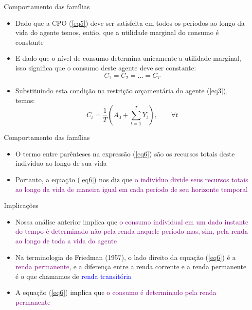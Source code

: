\documentclass[10pt]{beamer}
\begin{document}
\begin{frame}{Comportamento das famílias}
    \begin{itemize}
        \item Dado que a CPO (\ref{eq5}) deve ser satisfeita em todos os períodos ao longo da vida do agente temos, então, que a utilidade marginal do consumo é constante
        \bigskip
        \item E dado que o nível de consumo determina unicamente a utilidade marginal, isso significa que o consumo deste agente deve ser constante:
        \[
        C_1 = C_2 = \dots = C_T
        \]
        \bigskip
        \item Substituindo esta condição na restrição orçamentária do agente (\ref{eq3}), temos:
        \begin{equation}
            C_t = \frac{1}{T}\left(A_0 + \sum_{t=1}^T Y_t\right), \qquad \forall t \label{eq6}
        \end{equation}
    \end{itemize}
\end{frame}

\begin{frame}{Comportamento das famílias}
    \begin{itemize}
        \item O termo entre parênteses na expressão (\ref{eq6}) são os recursos totais deste indivíduo ao longo de sua vida
        \bigskip
        \item Portanto, a equação (\ref{eq6}) nos diz que \textcolor{purple}{o indivíduo divide seus recursos totais ao longo da vida de maneira igual em cada período de seu horizonte temporal}
    \end{itemize}
\end{frame}

\begin{frame}{Implicações}
    \begin{itemize}
        \item Nossa análise anterior implica que \textcolor{purple}{o consumo individual em um dado instante do tempo é determinado não pela renda naquele período mas, sim, pela renda ao longo de toda a vida do agente}
        \bigskip
        \item Na terminologia de Friedman (1957), o lado direito da equação (\ref{eq6}) é a \textcolor{purple}{renda permanente}, e a diferença entre a renda corrente e a renda permanente é o que chamamos de \textcolor{blue}{renda transitória}
        \bigskip
        \item A equação (\ref{eq6}) implica que \textcolor{purple}{o consumo é determinado pela renda permanente}
    \end{itemize}
\end{frame}
\end{document}
